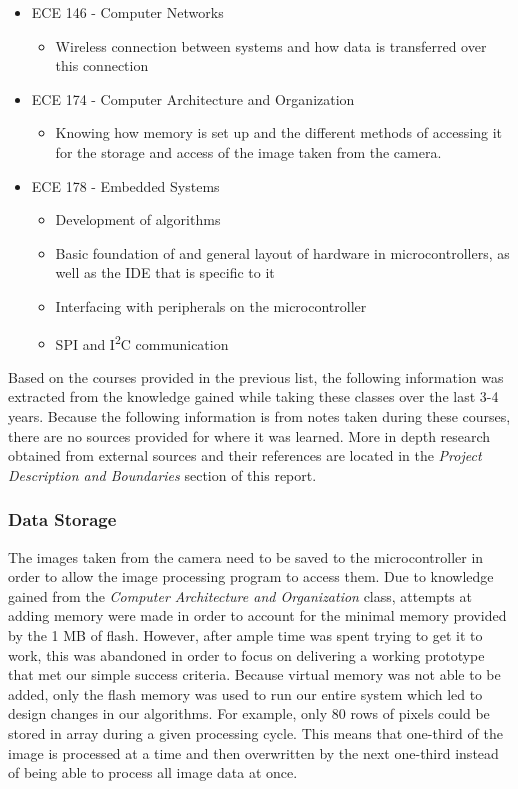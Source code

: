 \begin{itemize}
\begin{itemize}
	\end{itemize}
\item ECE 146 - Computer Networks
	\begin{itemize}
		\item Wireless connection between systems and how data is transferred over this connection
	\end{itemize}
\item ECE 174 - Computer Architecture and Organization
	\begin{itemize}
		\item Knowing how memory is set up and the different methods of accessing it for the storage and access of the image taken from the camera.
	\end{itemize}
\item ECE 178 - Embedded Systems
	\begin{itemize}
		\item Development of algorithms
		\item Basic foundation of and general layout of hardware in microcontrollers, as well as the IDE that is specific to it
		\item Interfacing with peripherals on the microcontroller
		\item SPI and I\textsuperscript{2}C communication
	\end{itemize}
\end{itemize}\par
 
Based on the courses provided in the previous list, the following information was extracted from the knowledge gained while taking these classes over the last 3-4 years. Because the following information is from notes taken during these courses, there are no sources provided for where it was learned. More in depth research obtained from external sources and their references are located in the \textit{Project Description and Boundaries} section of this report.\\

\subsubsection{Data Storage}
The images taken from the camera need to be saved to the microcontroller in order to allow the image processing program to access them. Due to knowledge gained from the \textit{Computer Architecture and Organization} class, attempts at adding memory were made in order to account for the minimal memory provided by the 1 MB of flash. However, after ample time was spent trying to get it to work, this was abandoned in order to focus on delivering a working prototype that met our simple success criteria. Because virtual memory was not able to be added, only the flash memory was used to run our entire system which led to design changes in our algorithms. For example, only 80 rows of pixels could be stored in array during a given processing cycle. This means that one-third of the image is processed at a time and then overwritten by the next one-third instead of being able to process all image data at once.\\
